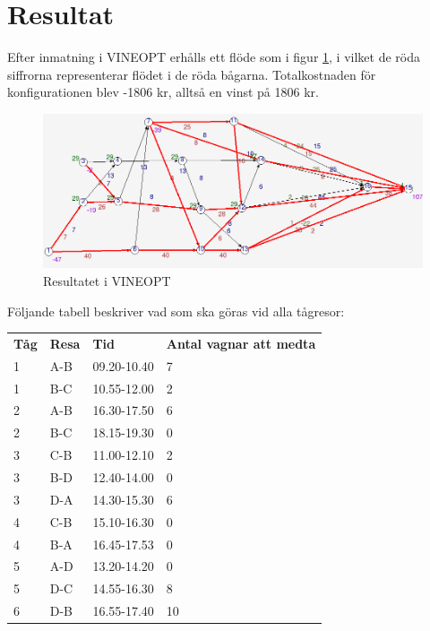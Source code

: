 \documentclass[a4paper,titlepage,12pt]{article}
\begin{document}
\newpage
\section*{Resultat}
Efter inmatning i VINEOPT erhålls ett flöde som i figur \ref{resfig}, i vilket
de röda siffrorna representerar flödet i de röda bågarna. Totalkostnaden för
konfigurationen blev -1806 kr, alltså en vinst på 1806 kr.

\begin{figure}[h]
    \begin{centering}
        \includegraphics[width=15cm]{res.png}
        \caption{Resultatet i VINEOPT\label{resfig}}
    \end{centering}
\end{figure}

Följande tabell beskriver vad som ska göras vid alla tågresor:

\begin{tabular}{l l l l} 
    \textbf{Tåg} & \textbf{Resa} & \textbf{Tid} & \textbf{Antal vagnar att
    medta}  \\
    1 & A-B & 09.20-10.40 & 7 \\
    1 & B-C & 10.55-12.00 & 2 \\
    2 & A-B & 16.30-17.50 & 6 \\
    2 & B-C & 18.15-19.30 & 0 \\
    3 & C-B & 11.00-12.10 & 2 \\
    3 & B-D & 12.40-14.00 & 0 \\
    3 & D-A & 14.30-15.30 & 6 \\
    4 & C-B & 15.10-16.30 & 0 \\
    4 & B-A & 16.45-17.53 & 0 \\
    5 & A-D & 13.20-14.20 & 0 \\
    5 & D-C & 14.55-16.30 & 8 \\
    6 & D-B & 16.55-17.40 & 10 \\
\end{tabular}
\end{document}
